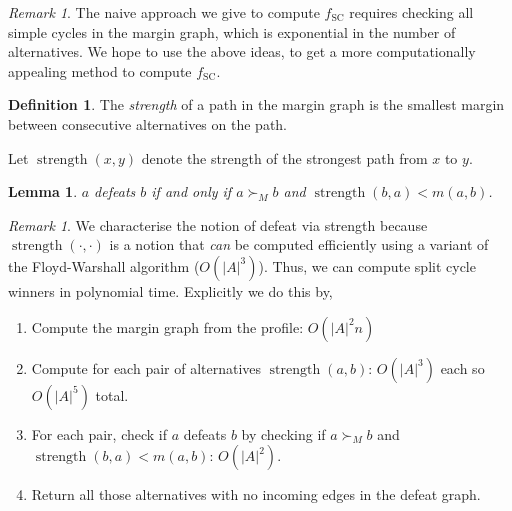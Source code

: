 \documentclass{book}
\theoremstyle{plain}
\newtheorem{lemma}[theorem]{Lemma}
\theoremstyle{definition}
\newtheorem{definition}[theorem]{Definition}
\theoremstyle{remark}
\newtheorem{remark}[theorem]{Remark}
\begin{document}
\begin{remark}
    The naive approach we give to 
    compute $f_{\text{SC}}$ requires checking all 
    simple cycles in the margin graph,
    which is exponential in the number of alternatives.
    We hope to use the above ideas, to get a more computationally
    appealing method to compute 
    $f_{\text{SC}}$.
\end{remark}


\begin{definition}
    The \emph{strength} of a path 
    in the margin graph is the smallest 
    margin between consecutive alternatives on the path.

    Let $\operatorname{strength}(x, y)$ denote the strength of the strongest path 
    from $x$ to $y$.
\end{definition}

\begin{lemma}\label{l:strength-characterization-SC}
    $a$ defeats $b$ if and only if
    $a \succ_M b$ and 
    $\operatorname{strength}(b, a) < m(a, b)$.
\end{lemma}

\begin{remark}
    We characterise the notion of defeat via 
    strength because $\operatorname{strength}(\cdot, \cdot)$ is a notion that \emph{can}
    be computed efficiently using a variant of the 
    Floyd-Warshall algorithm ($O(|A|^3)$).
    Thus, we can compute split cycle winners in polynomial time.
    Explicitly we do this by, 
    \begin{enumerate}
        \item Compute the margin graph from the profile: $O(|A|^2n)$
        \item Compute for each pair of alternatives 
        $\operatorname{strength}(a, b)$: $O(|A|^3)$ each so $O(|A|^5)$ total.
        \item For each pair, check if 
        $a$ defeats $b$ by checking if $a \succ_M b$ and $\operatorname{strength}(b, a) < m(a, b)$: $O(|A|^2)$.
        \item Return all those alternatives with no incoming edges in the defeat graph.
    \end{enumerate}
\end{remark}
\end{document}
